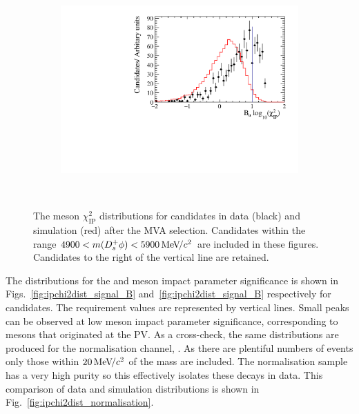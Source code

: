 \begin{figure}[!h]
\begin{subfigure}[t]{0.32\textwidth}
      \includegraphics[width=1.0\textwidth]{figs/Selection/Data_MC_Comparison_Var_1_B2DsPhi_Ds2KPiPi.pdf}
      \caption{\decay{\Dsp}{\Kp\pim\pip}}
   \end{subfigure}\\
   \caption{The \Dsp meson $\chi^{2}_{\text{IP}}$ distributions for \decay{\Bp}{\Dsp\phiz} candidates in data (black) and simulation (red) after the MVA selection. Candidates within the range $4900 < m({{D}^+_{s}}\phi) < 5900 {\mathrm{\,Me\kern -0.1em V\!/}c^2}$ are included in these figures. Candidates to the right of the vertical line are retained.}
   \label{fig:ipchi2dist_signal_D}   
\end{figure}

The distributions for the \Bp and \Dsp meson impact parameter significance is shown in Figs.~\ref{fig:ipchi2dist_signal_B} and~\ref{fig:ipchi2dist_signal_B} respectively for \decay{\Bp}{\Dsp\phiz} candidates. The requirement values are represented by vertical lines. Small peaks can be observed at low \Dsp meson impact parameter significance, corresponding to \Dsp mesons that originated at the PV. 
As a cross-check, the same distributions are produced for the normalisation channel, \decay{\Bp}{\Dsp\Dzb}. 
As there are plentiful numbers of events only those within $20{\mathrm{\,Me\kern -0.1em V\!/}c^2}$ of the \Bp mass are included. The normalisation sample has a very high purity so this effectively isolates these decays in data. This comparison of data and simulation distributions is shown in Fig.~\ref{fig:ipchi2dist_normalisation}.

